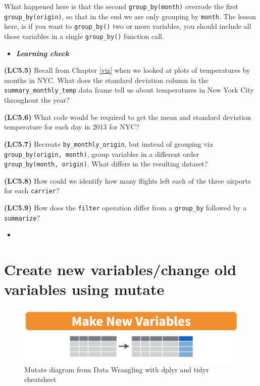 \documentclass[12pt,]{krantz}
\newenvironment{rmdblock}[1]
  {\begin{shaded*}
  \begin{itemize}
  \renewcommand{\labelitemi}{
    \raisebox{-.7\height}[0pt][0pt]{
    }
  }
  \item
  }
  {
  \end{itemize}
  \end{shaded*}
  }
\newenvironment{learncheck}
  {\begin{rmdblock}{warning}}
  {\end{rmdblock}}
\begin{document}
What happened here is that the second \texttt{group\_by(month)} overrode
the first \texttt{group\_by(origin)}, so that in the end we are only
grouping by \texttt{month}. The lesson here, is if you want to
\texttt{group\_by()} two or more variables, you should include all these
variables in a single \texttt{group\_by()} function call.

\begin{learncheck}
\textbf{\emph{Learning check}}
\end{learncheck}

\textbf{(LC5.5)} Recall from Chapter \ref{viz} when we looked at plots
of temperatures by months in NYC. What does the standard deviation
column in the \texttt{summary\_monthly\_temp} data frame tell us about
temperatures in New York City throughout the year?

\textbf{(LC5.6)} What code would be required to get the mean and
standard deviation temperature for each day in 2013 for NYC?

\textbf{(LC5.7)} Recreate \texttt{by\_monthly\_origin}, but instead of
grouping via \texttt{group\_by(origin,\ month)}, group variables in a
different order \texttt{group\_by(month,\ origin)}. What differs in the
resulting dataset?

\textbf{(LC5.8)} How could we identify how many flights left each of the
three airports for each \texttt{carrier}?

\textbf{(LC5.9)} How does the \texttt{filter} operation differ from a
\texttt{group\_by} followed by a \texttt{summarize}?

\begin{learncheck}

\end{learncheck}

\section{Create new variables/change old variables using
mutate}\label{mutate}

\begin{figure}

{\centering \includegraphics[width=\textwidth]{images/mutate} 

}

\caption{Mutate diagram from Data Wrangling with dplyr and tidyr cheatsheet}\label{fig:select}
\end{figure}
\end{document}
